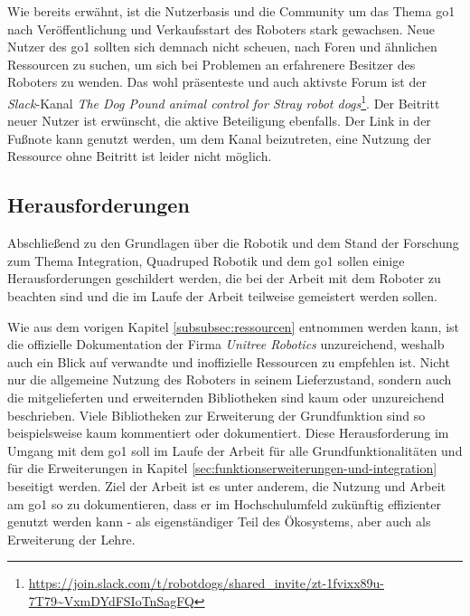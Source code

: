 
Wie bereits erwähnt, ist die Nutzerbasis und die Community um das Thema \gls{go1} nach Veröffentlichung und Verkaufsstart
des Roboters stark gewachsen.
Neue Nutzer des \gls{go1} sollten sich demnach nicht scheuen, nach Foren und ähnlichen Ressourcen zu suchen, um sich bei
Problemen an erfahrenere Besitzer des Roboters zu wenden.
Das wohl präsenteste und auch aktivste Forum ist der \emph{Slack}-Kanal
\emph{The Dog Pound animal control for Stray robot dogs}\footnote{\url{https://join.slack.com/t/robotdogs/shared_invite/zt-1fvixx89u-7T79~VxmDYdFSIoTnSagFQ}}.
Der Beitritt neuer Nutzer ist erwünscht, die aktive Beteiligung ebenfalls.
Der Link in der Fußnote kann genutzt werden, um dem Kanal beizutreten, eine Nutzung der Ressource ohne Beitritt ist leider
nicht möglich.

\subsection{Herausforderungen}
\label{subsec:herausforderungen}

Abschließend zu den Grundlagen über die Robotik und dem Stand der Forschung zum Thema Integration, Quadruped Robotik und dem \gls{go1}
sollen einige Herausforderungen geschildert werden, die bei der Arbeit mit dem Roboter zu beachten sind und die im Laufe
der Arbeit teilweise gemeistert werden sollen.



Wie aus dem vorigen Kapitel \ref{subsubsec:ressourcen} entnommen werden kann, ist die offizielle Dokumentation der Firma
\emph{Unitree Robotics} unzureichend, weshalb auch ein Blick auf verwandte und inoffizielle Ressourcen zu empfehlen ist.
Nicht nur die allgemeine Nutzung des Roboters in seinem Lieferzustand, sondern auch die mitgelieferten und erweiternden
Bibliotheken sind kaum oder unzureichend beschrieben.
Viele Bibliotheken zur Erweiterung der Grundfunktion sind so beispielsweise kaum kommentiert oder dokumentiert.
Diese Herausforderung im Umgang mit dem \gls{go1} soll im Laufe der Arbeit für alle Grundfunktionalitäten und für die Erweiterungen
in Kapitel \ref{sec:funktionserweiterungen-und-integration} beseitigt werden.
Ziel der Arbeit ist es unter anderem, die Nutzung und Arbeit am \gls{go1} so zu dokumentieren, dass er im Hochschulumfeld
zukünftig effizienter genutzt werden kann - als eigenständiger Teil des Ökosystems, aber auch als Erweiterung der Lehre.


